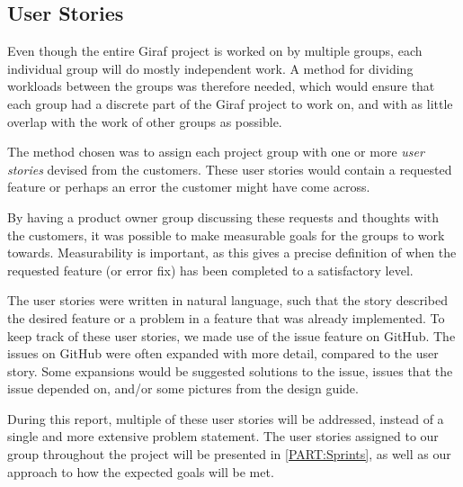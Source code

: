 \subsection{User Stories} \label{ssec:UserStories}
Even though the entire Giraf project is worked on by multiple groups, each individual group will do mostly independent work.
A method for dividing workloads between the groups was therefore needed, which would ensure that each group had a discrete part of the Giraf project to work on, and with as little overlap with the work of other groups as possible.

The method chosen was to assign each project group with one or more \textit{user stories} devised from the customers.
These user stories would contain a requested feature or perhaps an error the customer might have come across.

By having a product owner group discussing these requests and thoughts with the customers, it was possible to make measurable goals for the groups to work towards.
Measurability is important, as this gives a precise definition of when the requested feature (or error fix) has been completed to a satisfactory level.

The user stories were written in natural language, such that the story described the desired feature or a problem in a feature that was already implemented.
To keep track of these user stories, we made use of the issue feature on GitHub.
The issues on GitHub were often expanded with more detail, compared to the user story.
Some expansions would be suggested solutions to the issue, issues that the issue depended on, and/or some pictures from the design guide.

During this report, multiple of these user stories will be addressed, instead of a single and more extensive problem statement.
The user stories assigned to our group throughout the project will be presented in \autoref{PART:Sprints}, as well as our approach to how the expected goals will be met.
